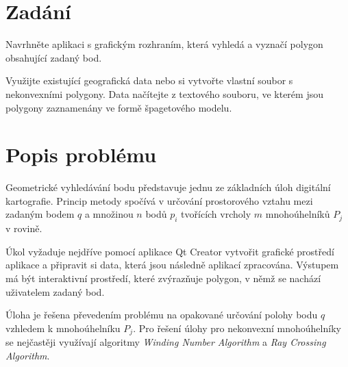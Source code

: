\documentclass[11pt]{article}
\begin{document}



\tableofcontents

\clearpage


\section{Zadání}
Navrhněte aplikaci s grafickým rozhraním, která vyhledá a vyznačí polygon obsahující zadaný bod.

Využijte existující geografická data nebo si vytvořte vlastní soubor s nekonvexními polygony. Data načítejte z textového souboru, ve kterém jsou polygony zaznamenány ve formě špagetového modelu. 


\section{Popis problému}
Geometrické vyhledávání bodu představuje jednu ze základních úloh digitální kartografie. 
Princip metody spočívá v určování prostorového vztahu mezi zadaným bodem $q$ a množinou $n$ bodů ${p_{i}}$ tvořících vrcholy $m$ mnohoúhelníků ${P_{j}}$ v rovině.

Úkol vyžaduje nejdříve pomocí aplikace Qt Creator vytvořit grafické prostředí aplikace a připravit si data, která jsou následně aplikací zpracována. Výstupem má být interaktivní prostředí, které zvýrazňuje polygon, v němž se nachází uživatelem zadaný bod. 


Úloha je řešena převedením problému na opakované určování polohy bodu $q$ vzhledem k mnohoúhelníku ${P_{j}}$. Pro řešení úlohy pro nekonvexní mnohoúhelníky se nejčastěji využívají algoritmy \textit {Winding Number Algorithm} a \textit{Ray Crossing Algorithm}.
\end{document}
